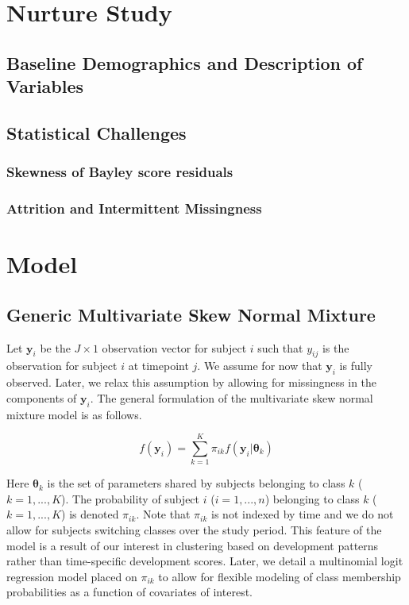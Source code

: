 \documentclass[useAMS,referee]{biom}
\begin{document}
\newpage

\section{Nurture Study}
\label{s:nurt}
\subsection{Baseline Demographics and Description of Variables}

\subsection{Statistical Challenges}
\subsubsection{Skewness of Bayley score residuals}
\subsubsection{Attrition and Intermittent Missingness}

\newpage

\section{Model}
\label{s:model}

\subsection{Generic Multivariate Skew Normal Mixture}

Let $\mathbf{y}_{i}$ be the $J \times 1$ observation vector for subject $i$ such that $y_{ij}$ is the observation for subject $i$ at timepoint $j$. We assume for now that $\mathbf{y}_{i}$ is fully observed. Later, we relax this assumption by allowing for missingness in the components of $\mathbf{y}_{i}$. The general formulation of the multivariate skew normal mixture model is as follows.

$$f(\mathbf{y}_i) = \sum_{k = 1}^{K} \pi_{ik} f(\mathbf{y}_i|\boldsymbol\theta_k)$$

Here $\boldsymbol\theta_k$ is the set of parameters shared by subjects belonging to class $k$ ($k = 1,...,K$). The probability of subject $i$ ($i = 1,...,n$) belonging to class $k$ ($k = 1,...,K$) is denoted $\pi_{ik}$. Note that $\pi_{ik}$ is not indexed by time and we do not allow for subjects switching classes over the study period. This feature of the model is a result of our interest in clustering based on development patterns rather than time-specific development scores. Later, we detail a multinomial logit regression model placed on $\pi_{ik}$ to allow for flexible modeling of class membership probabilities as a function of covariates of interest.
\end{document}

